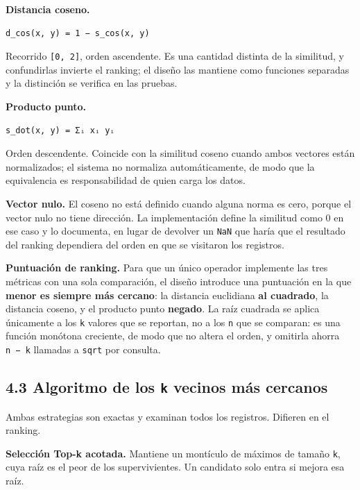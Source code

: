 \documentclass[11pt,a4paper]{article}
\let\pandocsubsection\subsection
\let\subsection\section
\let\subsubsection\pandocsubsection
\begin{document}
\textbf{Distancia coseno.}

\begin{verbatim}
d_cos(x, y) = 1 − s_cos(x, y)
\end{verbatim}

Recorrido \texttt{{[}0,\ 2{]}}, orden ascendente. Es una cantidad
distinta de la similitud, y confundirlas invierte el ranking; el diseño
las mantiene como funciones separadas y la distinción se verifica en las
pruebas.

\textbf{Producto punto.}

\begin{verbatim}
s_dot(x, y) = Σᵢ xᵢ yᵢ
\end{verbatim}

Orden descendente. Coincide con la similitud coseno cuando ambos
vectores están normalizados; el sistema no normaliza automáticamente, de
modo que la equivalencia es responsabilidad de quien carga los datos.

\textbf{Vector nulo.} El coseno no está definido cuando alguna norma es
cero, porque el vector nulo no tiene dirección. La implementación define
la similitud como 0 en ese caso y lo documenta, en lugar de devolver un
\texttt{NaN} que haría que el resultado del ranking dependiera del orden
en que se visitaron los registros.

\textbf{Puntuación de ranking.} Para que un único operador implemente
las tres métricas con una sola comparación, el diseño introduce una
puntuación en la que \textbf{menor es siempre más cercano}: la distancia
euclidiana \textbf{al cuadrado}, la distancia coseno, y el producto
punto \textbf{negado}. La raíz cuadrada se aplica únicamente a los
\texttt{k} valores que se reportan, no a los \texttt{n} que se comparan:
es una función monótona creciente, de modo que no altera el orden, y
omitirla ahorra \texttt{n\ −\ k} llamadas a \texttt{sqrt} por consulta.

\subsubsection{\texorpdfstring{4.3 Algoritmo de los \texttt{k} vecinos
más
cercanos}{4.3 Algoritmo de los k vecinos más cercanos}}\label{43-algoritmo-de-los-k-vecinos-muxe1s-cercanos}

Ambas estrategias son exactas y examinan todos los registros. Difieren
en el ranking.

\textbf{Selección Top-k acotada.} Mantiene un montículo de máximos de
tamaño \texttt{k}, cuya raíz es el peor de los supervivientes. Un
candidato solo entra si mejora esa raíz.
\end{document}
